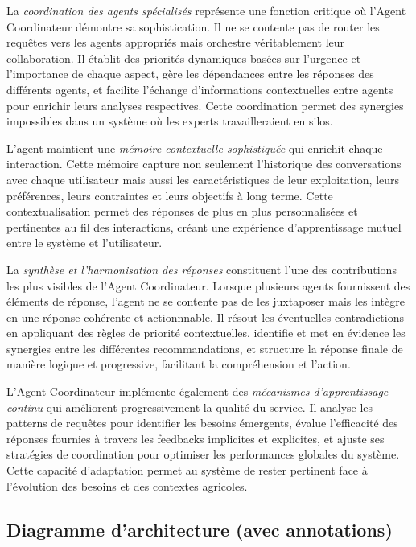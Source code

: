 La \emph{coordination des agents spécialisés} représente une fonction critique où l'Agent Coordinateur démontre sa sophistication. Il ne se contente pas de router les requêtes vers les agents appropriés mais orchestre véritablement leur collaboration. Il établit des priorités dynamiques basées sur l'urgence et l'importance de chaque aspect, gère les dépendances entre les réponses des différents agents, et facilite l'échange d'informations contextuelles entre agents pour enrichir leurs analyses respectives. Cette coordination permet des synergies impossibles dans un système où les experts travailleraient en silos.

L'agent maintient une \emph{mémoire contextuelle sophistiquée} qui enrichit chaque interaction. Cette mémoire capture non seulement l'historique des conversations avec chaque utilisateur mais aussi les caractéristiques de leur exploitation, leurs préférences, leurs contraintes et leurs objectifs à long terme. Cette contextualisation permet des réponses de plus en plus personnalisées et pertinentes au fil des interactions, créant une expérience d'apprentissage mutuel entre le système et l'utilisateur.

La \emph{synthèse et l'harmonisation des réponses} constituent l'une des contributions les plus visibles de l'Agent Coordinateur. Lorsque plusieurs agents fournissent des éléments de réponse, l'agent ne se contente pas de les juxtaposer mais les intègre en une réponse cohérente et actionnnable. Il résout les éventuelles contradictions en appliquant des règles de priorité contextuelles, identifie et met en évidence les synergies entre les différentes recommandations, et structure la réponse finale de manière logique et progressive, facilitant la compréhension et l'action.

L'Agent Coordinateur implémente également des \emph{mécanismes d'apprentissage continu} qui améliorent progressivement la qualité du service. Il analyse les patterns de requêtes pour identifier les besoins émergents, évalue l'efficacité des réponses fournies à travers les feedbacks implicites et explicites, et ajuste ses stratégies de coordination pour optimiser les performances globales du système. Cette capacité d'adaptation permet au système de rester pertinent face à l'évolution des besoins et des contextes agricoles.

\subsection{Diagramme d'architecture (avec annotations)}

